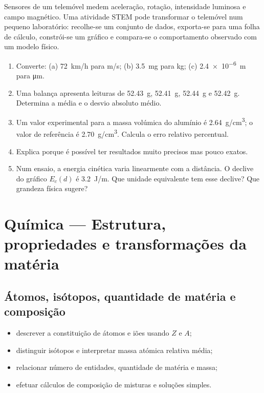 \documentclass[11pt,a4paper,oneside]{book}
\begin{document}
\begin{mundo}
Sensores de um telemóvel medem aceleração, rotação, intensidade luminosa e campo magnético. Uma atividade STEM pode transformar o telemóvel num pequeno laboratório: recolhe-se um conjunto de dados, exporta-se para uma folha de cálculo, constrói-se um gráfico e compara-se o comportamento observado com um modelo físico.
\end{mundo}

\begin{exercicios}
\begin{enumerate}
  \item Converte: (a) \SI{72}{km/h} para \si{m/s}; (b) \SI{3.5}{mg} para kg; (c) \SI{2.4e-6}{m} para \si{\micro m}.
  \item Uma balança apresenta leituras de \SI{52.43}{g}, \SI{52.41}{g}, \SI{52.44}{g} e \SI{52.42}{g}. Determina a média e o desvio absoluto médio.
  \item Um valor experimental para a massa volúmica do alumínio é \SI{2.64}{g/cm^3}; o valor de referência é \SI{2.70}{g/cm^3}. Calcula o erro relativo percentual.
  \item Explica porque é possível ter resultados muito precisos mas pouco exatos.
  \item Num ensaio, a energia cinética varia linearmente com a distância. O declive do gráfico $E_c(d)$ é \SI{3.2}{J/m}. Que unidade equivalente tem esse declive? Que grandeza física sugere?
\end{enumerate}
\end{exercicios}

\part{Química — Estrutura, propriedades e transformações da matéria}

\chapter{Átomos, isótopos, quantidade de matéria e composição}

\begin{objetivos}
\begin{itemize}
  \item descrever a constituição de átomos e iões usando $Z$ e $A$;
  \item distinguir isótopos e interpretar massa atómica relativa média;
  \item relacionar número de entidades, quantidade de matéria e massa;
  \item efetuar cálculos de composição de misturas e soluções simples.
\end{itemize}
\end{objetivos}
\end{document}
